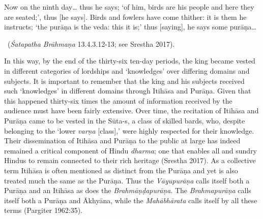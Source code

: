 \begin{myquote}
Now on the ninth day… thus he says; ‘of him, birds are his people and here they are seated;’, thus [he says]. Birds and fowlers have come thither: it is them he instructs; ‘the purāṇa is the veda: this it is;’ thus [saying], he says some purāṇa…

~\hfill (\textit{Śatapatha Brāhmaṇa} 13.4.3.12-13; see Srestha 2017).
\end{myquote}

In this way, by the end of the thirty-six ten-day periods, the king became vested in different categories of lordships and ‘knowledges’ over differing domains and subjects. It is important to remember that the king and his subjects received such ‘knowledges’ in different domains through Itihāsa and Purāṇa. Given that this happened thirty-six times the amount of information received by the audience must have been fairly extensive. Over time, the recitation of Itihāsa and Purāṇa came to be vested in the Sūta-s, a class of skilled bards, who, despite belonging to the ‘lower \textit{varṇa} [class],’ were highly respected for their knowledge. Their dissemination of Itihāsa and Purāṇa to the public at large has indeed remained a critical component of Hindu \textit{dharma}; one that enables all and sundry Hindus to remain connected to their rich heritage (Srestha 2017). As a collective term Itihāsa is often mentioned as distinct from the Purāṇa and yet is also treated much the same as the Purāṇa. Thus the \textit{Vāyupurāṇa} calls itself both a Purāṇa and an Itihāsa as does the \textit{Brahmāṇḍapurāṇa}. The \textit{Brahmapurāṇa} calls itself both a Purāṇa and Ākhyāna, while the \textit{Mahābhārata} calls itself by all these terms (Pargiter 1962:35). 

